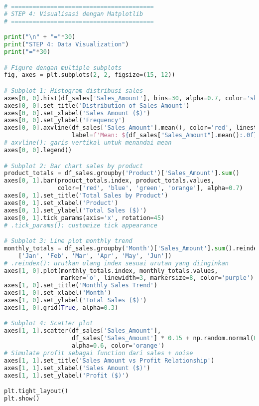 \begin{lstlisting}[language=python, caption={Visualisasi dengan Matplotlib dan Seaborn}, style=python]
# ========================================
# STEP 4: Visualisasi dengan Matplotlib
# ========================================

print("\n" + "="*30)
print("STEP 4: Data Visualization")
print("="*30)

# Figure dengan multiple subplots
fig, axes = plt.subplots(2, 2, figsize=(15, 12))

# Subplot 1: Histogram distribusi sales
axes[0, 0].hist(df_sales['Sales_Amount'], bins=30, alpha=0.7, color='skyblue', edgecolor='black')
axes[0, 0].set_title('Distribution of Sales Amount')
axes[0, 0].set_xlabel('Sales Amount ($)')
axes[0, 0].set_ylabel('Frequency')
axes[0, 0].axvline(df_sales['Sales_Amount'].mean(), color='red', linestyle='--',
                   label=f'Mean: ${df_sales["Sales_Amount"].mean():.0f}')
# axvline(): garis vertikal untuk menandai mean
axes[0, 0].legend()

# Subplot 2: Bar chart sales by product
product_totals = df_sales.groupby('Product')['Sales_Amount'].sum()
axes[0, 1].bar(product_totals.index, product_totals.values,
               color=['red', 'blue', 'green', 'orange'], alpha=0.7)
axes[0, 1].set_title('Total Sales by Product')
axes[0, 1].set_xlabel('Product')
axes[0, 1].set_ylabel('Total Sales ($)')
axes[0, 1].tick_params(axis='x', rotation=45)
# .tick_params(): customize tick appearance

# Subplot 3: Line plot monthly trend
monthly_totals = df_sales.groupby('Month')['Sales_Amount'].sum().reindex(
    ['Jan', 'Feb', 'Mar', 'Apr', 'May', 'Jun'])
# .reindex(): urutkan ulang index sesuai urutan yang diinginkan
axes[1, 0].plot(monthly_totals.index, monthly_totals.values,
                marker='o', linewidth=3, markersize=8, color='purple')
axes[1, 0].set_title('Monthly Sales Trend')
axes[1, 0].set_xlabel('Month')
axes[1, 0].set_ylabel('Total Sales ($)')
axes[1, 0].grid(True, alpha=0.3)

# Subplot 4: Scatter plot
axes[1, 1].scatter(df_sales['Sales_Amount'],
                   df_sales['Sales_Amount'] * 0.15 + np.random.normal(0, 20, n_samples),
                   alpha=0.6, color='orange')
# Simulate profit sebagai function dari sales + noise
axes[1, 1].set_title('Sales Amount vs Profit Relationship')
axes[1, 1].set_xlabel('Sales Amount ($)')
axes[1, 1].set_ylabel('Profit ($)')

plt.tight_layout()
plt.show()


\end{lstlisting}
